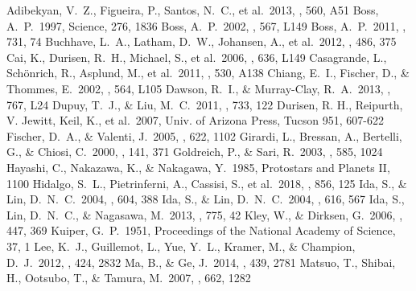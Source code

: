 \documentclass[twocolumn, dvipdfmx]{aastex62}
\begin{document}
\begin{CJK*}{UTF8}{min}
\begin{thebibliography}{}
 Adibekyan, V.~Z., Figueira, P., Santos, N.~C., et al.\ 2013, \aap, 560, A51
 Boss, A.~P.\ 1997, Science, 276, 1836
 Boss, A.~P.\ 2002, \apjl, 567, L149
 Boss, A.~P.\ 2011, \apj, 731, 74
 Buchhave, L.~A., Latham, D.~W., Johansen, A., et al.\ 2012, \nat, 486, 375
 Cai, K., Durisen, R.~H., Michael, S., et al.\ 2006, \apjl, 636, L149
 Casagrande, L., Sch{\"o}nrich, R., Asplund, M., et al.\ 2011, \aap, 530, A138
 Chiang, E.~I., Fischer, D., \& Thommes, E.\ 2002, \apjl, 564, L105
 Dawson, R.~I., \& Murray-Clay, R.~A.\ 2013, \apjl, 767, L24
 Dupuy, T.~J., \& Liu, M.~C.\ 2011, \apj, 733, 122
 Durisen, R. H., Reipurth, V. Jewitt, Keil, K., et al.\ 2007, Univ. of Arizona Press, Tucson 951, 607-622
 Fischer, D.~A., \& Valenti, J.\ 2005, \apj, 622, 1102
 Girardi, L., Bressan, A., Bertelli, G., \& Chiosi, C.\ 2000, \aaps, 141, 371
 Goldreich, P., \& Sari, R.\ 2003, \apj, 585, 1024
 Hayashi, C., Nakazawa, K., \& Nakagawa, Y.\ 1985, Protostars and Planets II, 1100
 Hidalgo, S.~L., Pietrinferni, A., Cassisi, S., et al.\ 2018, \apj, 856, 125
 Ida, S., \& Lin, D.~N.~C.\ 2004, \apj, 604, 388
 Ida, S., \& Lin, D.~N.~C.\ 2004, \apj, 616, 567
 Ida, S., Lin, D.~N.~C., \& Nagasawa, M.\ 2013, \apj, 775, 42
 Kley, W., \& Dirksen, G.\ 2006, \aap, 447, 369
 Kuiper, G.~P.\ 1951, Proceedings of the National Academy of Science, 37, 1
 Lee, K.~J., Guillemot, L., Yue, Y.~L., Kramer, M., \& Champion, D.~J.\ 2012, \mnras, 424, 2832
 Ma, B., \& Ge, J.\ 2014, \mnras, 439, 2781
 Matsuo, T., Shibai, H., Ootsubo, T., \& Tamura, M.\ 2007, \apj, 662, 1282

\end{thebibliography}
\end{CJK*}
\end{document}
